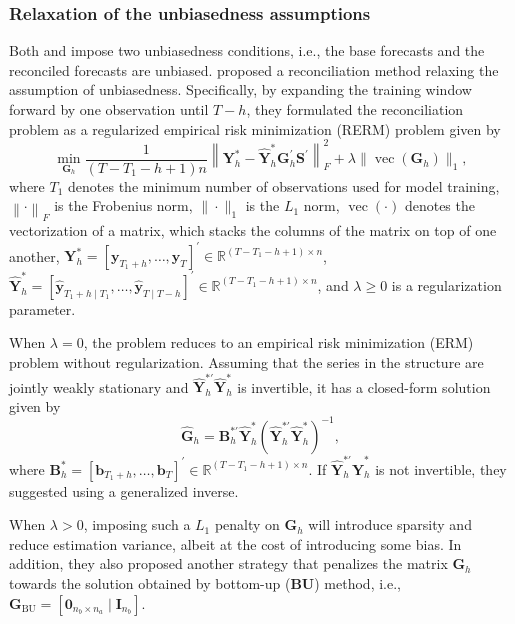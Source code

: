 \documentclass[
  12pt,
  11pt]{article}
\begin{document}
\hypertarget{relaxation-of-the-unbiasedness-assumptions}{%
\subsubsection{Relaxation of the unbiasedness
assumptions}\label{relaxation-of-the-unbiasedness-assumptions}}

Both \citet{Hyndman2011-sd} and \citet{Wickramasuriya2019-fc} impose two
unbiasedness conditions, i.e., the base forecasts and the reconciled
forecasts are unbiased. \citet{Ben_Taieb2019-be} proposed a
reconciliation method relaxing the assumption of unbiasedness.
Specifically, by expanding the training window forward by one
observation until \(T-h\), they formulated the reconciliation problem as
a regularized empirical risk minimization (RERM) problem given by \[
\min _{\bm{G}_h} \frac{1}{(T-T_1-h+1)n}\left\|\bm{Y}_{h}^{*}-\hat{\bm{Y}}_{h}^{*} \bm{G}_{h}^{\prime} \bm{S}^{\prime}\right\|_F^2+\lambda\|\operatorname{vec}( \bm{G}_h)\|_1,
\] where \(T_1\) denotes the minimum number of observations used for
model training, \(\left\| \cdot \right\|_F\) is the Frobenius norm,
\(\|\cdot\|_1\) is the \(L_1\) norm, \(\operatorname{vec}(\cdot)\)
denotes the vectorization of a matrix, which stacks the columns of the
matrix on top of one another,
\(\bm{Y}_{h}^{*}=\left[\bm{y}_{T_1+h}, \ldots, \bm{y}_T\right]^{\prime} \in \mathbb{R}^{\left(T-T_1-h+1\right) \times n}\),
\(\hat{\bm{Y}}_{h}^{*}=\left[\hat{\bm{y}}_{T_1+h \mid T_1}, \ldots, \hat{\bm{y}}_{T \mid T-h}\right]^{\prime} \in \mathbb{R}^{\left(T-T_1-h+1\right) \times n}\),
and \(\lambda \geq 0\) is a regularization parameter.

When \(\lambda = 0\), the problem reduces to an empirical risk
minimization (ERM) problem without regularization. Assuming that the
series in the structure are jointly weakly stationary and
\(\hat{\bm{Y}}_{h}^{*\prime}\hat{\bm{Y}}_{h}^{*}\) is invertible, it has
a closed-form solution given by \[
\hat{\bm{G}}_h = \bm{B}_{h}^{*\prime}\hat{\bm{Y}}_{h}^{*}\left(\hat{\bm{Y}}_{h}^{*\prime}\hat{\bm{Y}}_{h}^{*}\right)^{-1},
\] where
\(\bm{B}_{h}^{*}=\left[\bm{b}_{T_1+h}, \ldots, \bm{b}_T\right]^{\prime} \in \mathbb{R}^{\left(T-T_1-h+1\right) \times n}\).
If \(\hat{\bm{Y}}_{h}^{*\prime}\hat{\bm{Y}}_{h}^{*}\) is not invertible,
they suggested using a generalized inverse.

When \(\lambda > 0\), imposing such a \(L_1\) penalty on \(\bm{G}_h\)
will introduce sparsity and reduce estimation variance, albeit at the
cost of introducing some bias. In addition, they also proposed another
strategy that penalizes the matrix \(\bm{G}_h\) towards the solution
obtained by bottom-up (\textbf{BU}) method, i.e.,
\(\bm{G}_{\text{BU}} = \left[\bm{0}_{n_b \times n_a} \mid \bm{I}_{n_b}\right]\).
\end{document}

